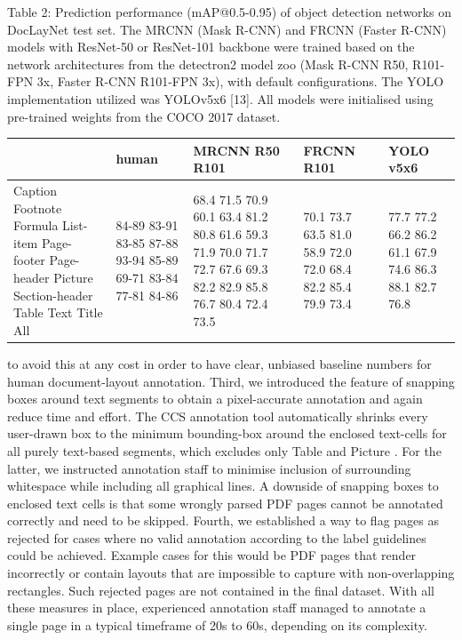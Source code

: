 \documentclass[11pt,a4paper]{article}
\begin{document}
Table 2: Prediction performance (mAP@0.5-0.95) of object detection networks on DocLayNet test set. The MRCNN (Mask R-CNN) and FRCNN (Faster R-CNN) models with ResNet-50 or ResNet-101 backbone were trained based on the network architectures from the detectron2 model zoo (Mask R-CNN R50, R101-FPN 3x, Faster R-CNN R101-FPN 3x), with default configurations. The YOLO implementation utilized was YOLOv5x6 [13]. All models were initialised using pre-trained weights from the COCO 2017 dataset.

\begin{table}[h]
\begin{tabular}{|l|l|l|l|l|}
\hline
 & human & MRCNN R50 R101 & FRCNN R101 & YOLO v5x6 \\ \hline
Caption Footnote Formula List-item Page-footer Page-header Picture Section-header Table Text Title All & 84-89 83-91 83-85 87-88 93-94 85-89 69-71 83-84 77-81 84-86 & 68.4 71.5 70.9 60.1 63.4 81.2 80.8 61.6 59.3 71.9 70.0 71.7 72.7 67.6 69.3 82.2 82.9 85.8 76.7 80.4 72.4 73.5 & 70.1 73.7 63.5 81.0 58.9 72.0 72.0 68.4 82.2 85.4 79.9 73.4 & 77.7 77.2 66.2 86.2 61.1 67.9 74.6 86.3 88.1 82.7 76.8 \\ \hline
\end{tabular}
\end{table}

to avoid this at any cost in order to have clear, unbiased baseline numbers for human document-layout annotation. Third, we introduced the feature of snapping boxes around text segments to obtain a pixel-accurate annotation and again reduce time and effort. The CCS annotation tool automatically shrinks every user-drawn box to the minimum bounding-box around the enclosed text-cells for all purely text-based segments, which excludes only Table and Picture . For the latter, we instructed annotation staff to minimise inclusion of surrounding whitespace while including all graphical lines. A downside of snapping boxes to enclosed text cells is that some wrongly parsed PDF pages cannot be annotated correctly and need to be skipped. Fourth, we established a way to flag pages as rejected for cases where no valid annotation according to the label guidelines could be achieved. Example cases for this would be PDF pages that render incorrectly or contain layouts that are impossible to capture with non-overlapping rectangles. Such rejected pages are not contained in the final dataset. With all these measures in place, experienced annotation staff managed to annotate a single page in a typical timeframe of 20s to 60s, depending on its complexity.
\end{document}
